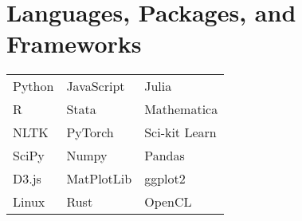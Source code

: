 \documentclass[10pt,a4paper,sans]{moderncv}
\begin{document}
\section{Languages, Packages, and Frameworks}
\def\arraystretch{0}
\raggedleft
\begin{tabularx}{.9\textwidth}{>{\center\arraybackslash}X >{\center\arraybackslash}X >{\center\arraybackslash}X}
Python & JavaScript & Julia \\
R & Stata & Mathematica \\
NLTK & PyTorch & Sci-kit Learn \\
SciPy & Numpy & Pandas \\
D3.js & MatPlotLib & ggplot2 \\
Linux & Rust & OpenCL \\

\end{tabularx}
\end{document}
